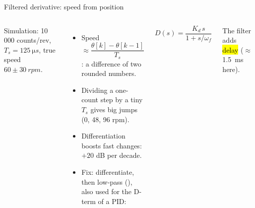 \documentclass[aspectratio=169,10pt]{beamer}
\newcommand{\dat}[1]{data/#1.dat}
\begin{document}
\begin{frame}{Filtered derivative: speed from position}
\begin{columns}[T]
\centering
{}
{\scriptsize\color{mkGray} Simulation: 10\,000 counts/rev, $T_s=\SI{125}{\micro s}$, true speed $60\pm\SI{30}{rpm}$.}
\begin{itemize}\small
\item Speed $\approx\dfrac{\theta[k]-\theta[k-1]}{T_s}$: a difference of two rounded numbers.
\item Dividing a one-count step by a tiny $T_s$ gives big jumps (0, 48, 96 rpm).
\item Differentiation boosts fast changes: $+20$ dB per decade.
\item Fix: differentiate, then low-pass (), also used for the D-term of a PID:
\end{itemize}
\begin{eqbox}
\vspace{-2mm}
\[ D(s)=\frac{K_d\,s}{1+s/\omega_f} \]
\vspace{-4mm}
\end{eqbox}
{\small The filter adds \hl{delay} ($\approx$\SI{1.5}{ms} here).}
\end{columns}
\end{frame}
\end{document}

